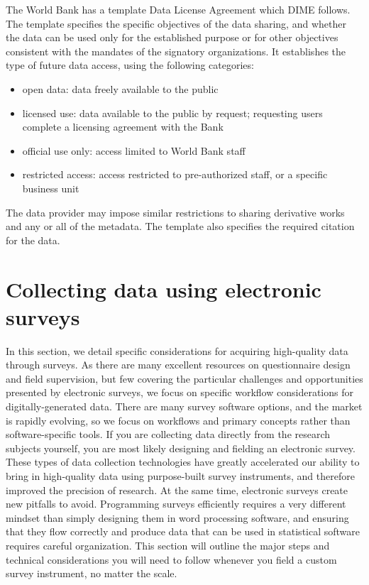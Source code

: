The World Bank has a template Data License Agreement which DIME follows.
The template specifies the specific objectives of the data sharing, 
and whether the data can be used only for the established purpose or for other objectives 
consistent with the mandates of the signatory organizations. 
It establishes the type of future data access, using the following categories:
\begin{itemize}	
	\item{open data: data freely available to the public}
	\item{licensed use: data available to the public by request; requesting users complete a licensing agreement with the Bank}
	\item{official use only: access limited to World Bank staff}
	\item{restricted access: access restricted to pre-authorized staff, or a specific business unit}
\end{itemize}
The data provider may impose similar restrictions to sharing derivative works and any or all of the metadata. 
The template also specifies the required citation for the data. 


\section{Collecting data using electronic surveys}
In this section, we detail specific considerations for acquiring high-quality data through surveys.
As there are many excellent resources on questionnaire design and field supervision,
but few covering the particular challenges and opportunities presented by electronic surveys,
we focus on specific workflow considerations for digitally-generated data. 
There are many survey software options, and the market is rapidly evolving,
so we focus on workflows and primary concepts rather than software-specific tools.
If you are collecting data directly from the research subjects yourself,
you are most likely designing and fielding an electronic survey.
These types of data collection technologies
have greatly accelerated our ability to bring in high-quality data
using purpose-built survey instruments,
and therefore improved the precision of research.
At the same time, electronic surveys create new pitfalls to avoid.
Programming surveys efficiently requires a very different mindset
than simply designing them in word processing software,
and ensuring that they flow correctly and produce data
that can be used in statistical software requires careful organization.
This section will outline the major steps and technical considerations
you will need to follow whenever you field a custom survey instrument,
no matter the scale.

